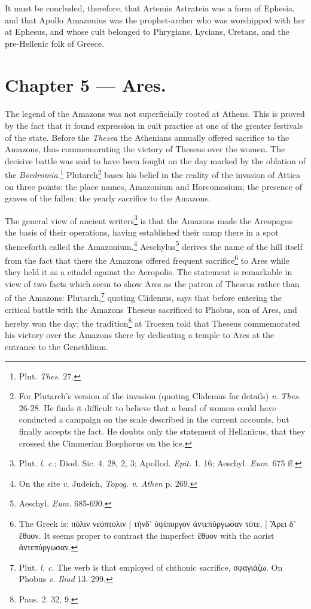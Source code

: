 \documentclass[a4paper, 12pt, oneside]{article}
\begin{document}
It must be concluded, therefore, that Artemis Astrateia was a form of Ephesia, and that Apollo Amazonius was the prophet-archer who was worshipped with her at Ephesus, and whose cult belonged to Phrygians, Lycians, Cretans, and the pre-Hellenic folk of Greece.
\clearpage
\section{Chapter 5 --- Ares.}
\paragraph{}
The legend of the Amazons was not superficially rooted at Athens. This is proved by the fact that it found expression in cult practice at one of the greater festivals of the state. Before the \emph{Thesea} the Athenians annually offered sacrifice to the Amazons, thus commemorating the victory of Theseus over the women. The decisive battle was said to have been fought on the day marked by the oblation of the \emph{Boedromia}.\footnote{Plut. \emph{Thes.} 27.} Plutarch\footnote{For Plutarch's version of the invasion (quoting Clidemus for details) \emph{v.} \emph{Thes.} 26-28. He finds it difficult to believe that a band of women could have conducted a campaign on the scale described in the current accounts, but finally accepts the fact. He doubts only the statement of Hellanicus, that they crossed the Cimmerian Bosphorus on the ice.} bases his belief in the reality of the invasion of Attica on three points: the place names, Amazonium and Horcomosium; the presence of graves of the fallen; the yearly sacrifice to the Amazons.

The general view of ancient writers\footnote{Plut. \emph{l. c.}; Diod. Sic. 4. 28, 2, 3; Apollod. \emph{Epit.} 1. 16; Aeschyl. \emph{Eum.} 675 ff.} is that the Amazons made the Areopagus the basis of their operations, having established their camp there in a spot thenceforth called the Amazonium.\footnote{On the site \emph{v.} Judeich, \emph{Topog. v. Athen} p. 269.} Aeschylus\footnote{Aeschyl. \emph{Eum.} 685-690.} derives the name of the hill itself from the fact that there the Amazons offered frequent sacrifice\footnote{The Greek is: πόλιν νεόπτολιν | τήνδ' ὑψίπυργον ἀντεπύργωσαν τότε, | Ἄρει δ' ἔθυον. It seems proper to contrast the imperfect ἔθυον with the aorist ἀντεπύργωσαν.} to Ares while they held it as a citadel against the Acropolis. The statement is remarkable in view of two facts which seem to show Ares as the patron of Theseus rather than of the Amazons: Plutarch,\footnote{Plut. \emph{l. c.} The verb is that employed of chthonic sacrifice, σφαγιάζω. On Phobus \emph{v.} \emph{Iliad} 13. 299.} quoting Clidemus, says that before entering the critical battle with the Amazons Theseus sacrificed to Phobus, son of Ares, and hereby won the day; the tradition\footnote{Paus. 2. 32, 9.} at Troezen told that Theseus commemorated his victory over the Amazons there by dedicating a temple to Ares at the entrance to the Genethlium.
\end{document}
